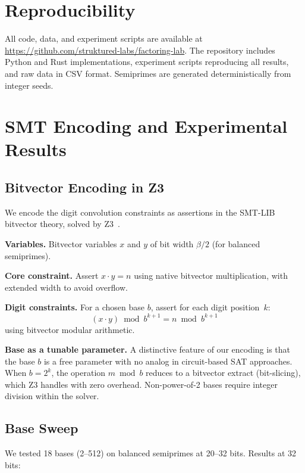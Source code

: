 \documentclass[11pt,a4paper]{article}
\begin{document}
\section*{Reproducibility}

All code, data, and experiment scripts are available at \url{https://github.com/struktured-labs/factoring-lab}. The repository includes Python and Rust implementations, experiment scripts reproducing all results, and raw data in CSV format. Semiprimes are generated deterministically from integer seeds.

\appendix
\section{SMT Encoding and Experimental Results}
\label{app:smt}

\subsection{Bitvector Encoding in Z3}

We encode the digit convolution constraints as assertions in the SMT-LIB bitvector theory, solved by Z3~\cite{demoura08}.

\textbf{Variables.} Bitvector variables $x$ and $y$ of bit width $\beta/2$ (for balanced semiprimes).

\textbf{Core constraint.} Assert $x \cdot y = n$ using native bitvector multiplication, with extended width to avoid overflow.

\textbf{Digit constraints.} For a chosen base $b$, assert for each digit position~$k$:
\[
(x \cdot y) \bmod b^{k+1} = n \bmod b^{k+1}
\]
using bitvector modular arithmetic.

\textbf{Base as a tunable parameter.}
A distinctive feature of our encoding is that the base $b$ is a free parameter with no analog in circuit-based SAT approaches. When $b = 2^k$, the operation $m \bmod b$ reduces to a bitvector extract (bit-slicing), which Z3 handles with zero overhead. Non-power-of-2 bases require integer division within the solver.

\subsection{Base Sweep}

We tested 18 bases (2--512) on balanced semiprimes at 20--32 bits. Results at 32 bits:
\end{document}
